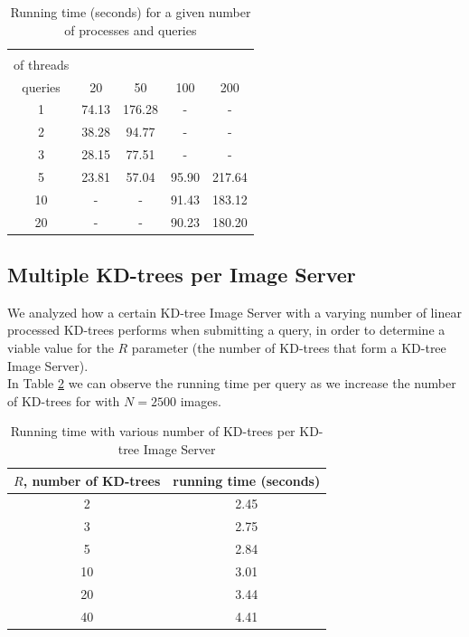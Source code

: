 \begin{table}[H]
\centering
\begin{tabular} {c | c | c | c | c}
	\backslashbox{number\\ of threads}{number of\\ queries} & 20 & 50 & 100 & 200 \\
	\hline
	1 & 74.13 & 176.28 & - & - \\
	2 & 38.28 & 94.77 & - & - \\
	3 & 28.15 & 77.51 & - & -\\
	5 & 23.81 & 57.04 & 95.90 & 217.64\\
	10 & - & - & 91.43 & 183.12 \\
	20 & - & - & 90.23 & 180.20 \\
\end{tabular}
\caption{Running time (seconds) for a given number of processes and queries}
\label{table:threadTime}
\end{table}

\subsection{Multiple KD-trees per Image Server}

We analyzed how a certain KD-tree Image Server with a varying number of linear processed KD-trees performs when submitting a query, in order to determine a viable value for the $R$ parameter (the number of KD-trees that form a KD-tree Image Server).\\
In Table \ref{table:multipleKDTrees} we can observe the running time per query as we increase the number of KD-trees for with $N=2500$ images.\\

\begin{table}[H]
\centering
\begin{tabular}{c | c}
	$R$, number of KD-trees & running time (seconds) \\
	\hline
	2 & 2.45 \\
	3 & 2.75 \\
	5 & 2.84 \\
	10 & 3.01 \\
	20 & 3.44 \\
	40 & 4.41 \\
\end{tabular}
\caption{Running time with various number of KD-trees per KD-tree Image Server}
\label{table:multipleKDTrees}
\end{table}

